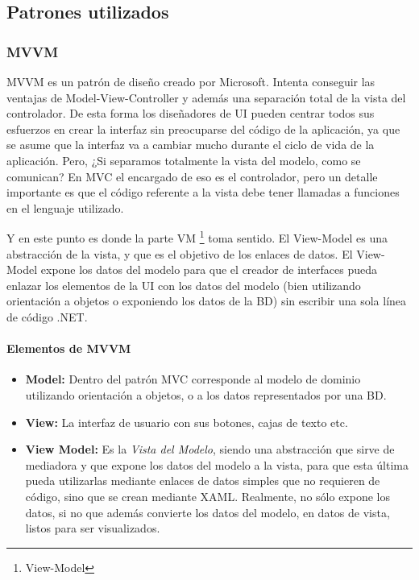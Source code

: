 \subsection{Patrones utilizados}

\subsubsection{MVVM}
MVVM es un patr\'{o}n de dise\~{n}o creado por Microsoft. Intenta conseguir las ventajas de Model-View-Controller y adem\'as una separaci\'{o}n total
de la vista del controlador. De esta forma los dise\~{n}adores de UI pueden centrar todos sus esfuerzos en crear la interfaz sin preocuparse 
del c\'{o}digo de la aplicaci\'{o}n, ya que se asume que la interfaz va a cambiar mucho durante el ciclo de vida de la aplicaci\'{o}n. Pero,
¿Si separamos totalmente la vista del modelo, como se comunican? En MVC el encargado de eso es el controlador, pero un detalle importante es 
que el c\'{o}digo referente a la vista debe tener llamadas a funciones en el lenguaje utilizado.

Y en este punto es donde la parte VM \footnote{View-Model} toma sentido. El View-Model es una abstracci\'{o}n de la vista, y que es el objetivo 
de los enlaces de datos. El View-Model expone los datos del modelo para que el creador de interfaces pueda enlazar los elementos de la UI
con los datos del modelo (bien utilizando orientaci\'{o}n a objetos o exponiendo los datos de la BD) sin escribir una sola l\'{i}nea de 
c\'{o}digo .NET.

\paragraph{Elementos de MVVM}

\begin{itemize}
    \item \textbf{Model:} Dentro del patr\'{o}n MVC corresponde al modelo de dominio utilizando orientaci\'{o}n a objetos, o a los datos
    representados por una BD.
    \item \textbf{View:} La interfaz de usuario con sus botones, cajas de texto etc.
    \item \textbf{View Model:} Es la \emph{Vista del Modelo}, siendo una abstracci\'{o}n que sirve de mediadora y que expone los datos
    del modelo a la vista, para que esta \'{u}ltima pueda utilizarlas mediante enlaces de datos simples que no requieren de c\'{o}digo, sino
    que se crean mediante XAML. Realmente, no s\'{o}lo expone los datos, si no que adem\'as convierte los datos del modelo, en datos de vista, listos
    para ser visualizados.
\end{itemize}

